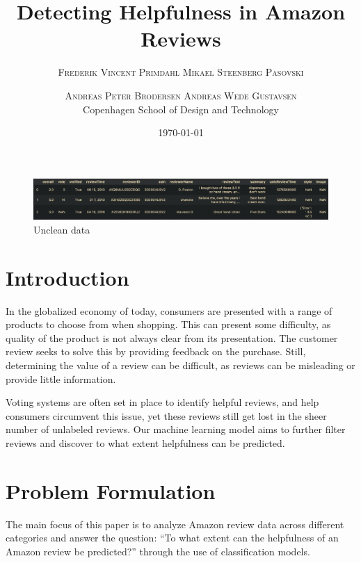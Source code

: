 \documentclass[twoside,twocolumn]{article}
\title{Detecting Helpfulness in Amazon Reviews} %
\author{%
\textsc{Frederik Vincent Primdahl} \textsc{Mikael Steenberg Pasovski} \and \textsc{Andreas Peter Brodersen} \textsc{Andreas Wede Gustavsen} \\[1ex] %
\normalsize Copenhagen School of Design and Technology \\ %
}
\date{\today} %
\begin{document}
\maketitle

\begin{figure}[h]
	\centering%
	\begin{center}
		\includegraphics[width=\textwidth]{img/unclean_data.pdf}
		\caption{Unclean data}
		\label{fig:unclean_data}
	\end{center}
\end{figure}

\section{Introduction}
In the globalized economy of today, consumers are presented with a range of products to choose from when shopping. This can present some difficulty, as quality of the product is not always clear from its presentation. The customer review seeks to solve this by providing feedback on the purchase. Still, determining the value of a review can be difficult, as reviews can be misleading or provide little information.

Voting systems are often set in place to identify helpful reviews, and help consumers circumvent this issue, yet these reviews still get lost in the sheer number of unlabeled reviews. Our machine learning model aims to further filter reviews and discover to what extent helpfulness can be predicted.

\section{Problem Formulation}

The main focus of this paper is to analyze Amazon review data across different categories and answer the question: “To what extent can the helpfulness of an Amazon review be predicted?” through the use of classification models.
\end{document}
